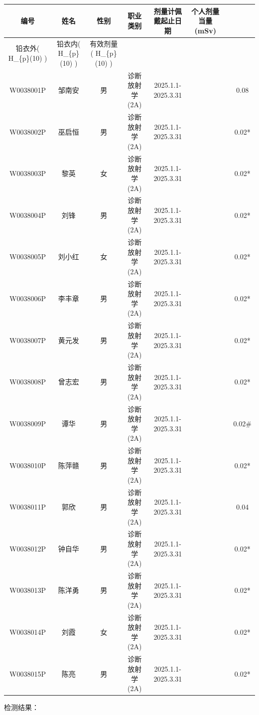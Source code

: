 \begin{table}[H]
\centering
\begin{tabular}{|c|c|c|c|c|c|c|c|}
\hline
编号 & 姓名 & 性别 & 职业类别 & 剂量计佩戴起止日期 & 个人剂量当量 (mSv) &  &  \\
\hline
铅衣外( H\_\{p\}(10) ) & 铅衣内( H\_\{p\}(10) ) & 有效剂量( H\_\{p\}(10) ) &  &  &  &  &  \\
\hline
W0038001P & 邹南安 & 男 & 诊断放射学(2A) & 2025.1.1-2025.3.31 &  &  & 0.08 \\
\hline
W0038002P & 巫启恒 & 男 & 诊断放射学(2A) & 2025.1.1-2025.3.31 &  &  & 0.02* \\
\hline
W0038003P & 黎英 & 女 & 诊断放射学(2A) & 2025.1.1-2025.3.31 &  &  & 0.02* \\
\hline
W0038004P & 刘锋 & 男 & 诊断放射学(2A) & 2025.1.1-2025.3.31 &  &  & 0.02* \\
\hline
W0038005P & 刘小红 & 女 & 诊断放射学(2A) & 2025.1.1-2025.3.31 &  &  & 0.02* \\
\hline
W0038006P & 李丰章 & 男 & 诊断放射学(2A) & 2025.1.1-2025.3.31 &  &  & 0.02* \\
\hline
W0038007P & 黄元发 & 男 & 诊断放射学(2A) & 2025.1.1-2025.3.31 &  &  & 0.02* \\
\hline
W0038008P & 曾志宏 & 男 & 诊断放射学(2A) & 2025.1.1-2025.3.31 &  &  & 0.02* \\
\hline
W0038009P & 谭华 & 男 & 诊断放射学(2A) & 2025.1.1-2025.3.31 &  &  & 0.02\# \\
\hline
W0038010P & 陈萍赣 & 男 & 诊断放射学(2A) & 2025.1.1-2025.3.31 &  &  & 0.02* \\
\hline
W0038011P & 郭欣 & 男 & 诊断放射学(2A) & 2025.1.1-2025.3.31 &  &  & 0.04 \\
\hline
W0038012P & 钟自华 & 男 & 诊断放射学(2A) & 2025.1.1-2025.3.31 &  &  & 0.02* \\
\hline
W0038013P & 陈洋勇 & 男 & 诊断放射学(2A) & 2025.1.1-2025.3.31 &  &  & 0.02* \\
\hline
W0038014P & 刘霞 & 女 & 诊断放射学(2A) & 2025.1.1-2025.3.31 &  &  & 0.02* \\
\hline
W0038015P & 陈亮 & 男 & 诊断放射学(2A) & 2025.1.1-2025.3.31 &  &  & 0.02* \\
\hline
\end{tabular}
\end{table}


检测结果：


